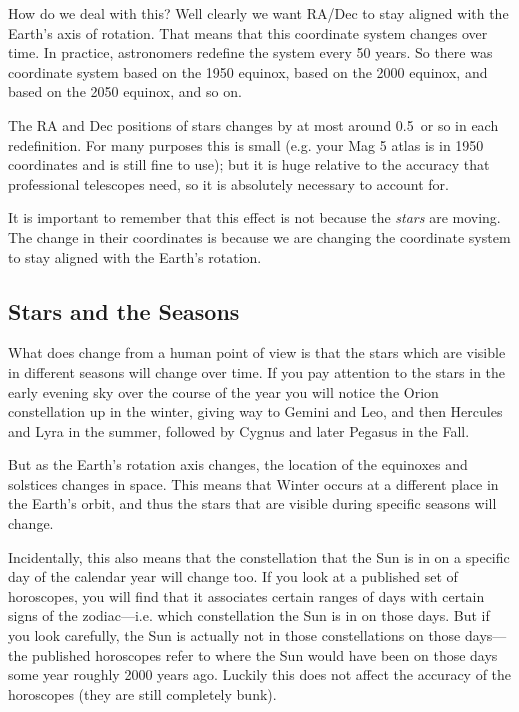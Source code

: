\documentclass[12pt, preprint]{aastex}
\begin{document}
How do we deal with this? Well clearly we want RA/Dec to stay aligned
with the Earth's axis of rotation. That means that this coordinate
system changes over time. In practice, astronomers redefine the system
every 50 years. So there was coordinate system based on the 1950
equinox, based on the 2000 equinox, and based on the 2050 equinox, and
so on.

The RA and Dec positions of stars changes by at most around
0.5\degree\ or so in each redefinition. For many purposes this is
small (e.g. your Mag 5 atlas is in 1950 coordinates and is still fine
to use); but it is huge relative to the accuracy that professional
telescopes need, so it is absolutely necessary to account for.

It is important to remember that this effect is not because the {\it
  stars} are moving. The change in their coordinates is because we are
changing the coordinate system to stay aligned with the Earth's
rotation.

\subsection{Stars and the Seasons}

What does change from a human point of view is that the stars which
are visible in different seasons will change over time. If you pay
attention to the stars in the early evening sky over the course of the year
you will notice the Orion constellation up in the winter, giving way
to Gemini and Leo, and then Hercules and Lyra in the summer, followed
by Cygnus and later Pegasus in the Fall.

But as the Earth's rotation axis changes, the location of the
equinoxes and solstices changes in space. This means that Winter
occurs at a different place in the Earth's orbit, and thus the stars
that are visible during specific seasons will change.

Incidentally, this also means that the constellation that the Sun is
in on a specific day of the calendar year will change too. If you look
at a published set of horoscopes, you will find that it associates
certain ranges of days with certain signs of the zodiac---i.e. which
constellation the Sun is in on those days.  But if you look carefully,
the Sun is actually not in those constellations on those days---the
published horoscopes refer to where the Sun would have been on those
days some year roughly 2000 years ago. Luckily this does not affect
the accuracy of the horoscopes (they are still completely bunk).
\end{document}
